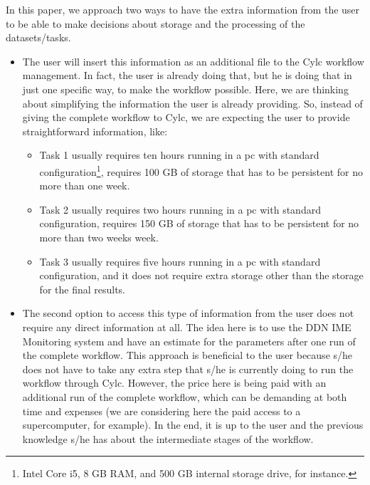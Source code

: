 \documentclass[a4paper]{article}
\begin{document}
In this paper, we approach two ways to have the extra information from the user to be able to make decisions about storage and the processing of the datasets/tasks.

\begin{itemize}

\item The user will insert this information as an additional file to the Cylc workflow management. In fact, the user is already doing that, but he is doing that in just one specific way, to make the workflow possible. Here, we are thinking about simplifying the information the user is already providing. So, instead of giving the complete workflow to Cylc, we are expecting the user to provide straightforward information, like:

\begin{itemize}

\item Task 1 usually requires ten hours running in a pc with standard configuration\footnote{Intel Core i5, 8 GB RAM, and 500 GB internal storage drive, for instance.}, requires 100 GB of storage that has to be persistent for no more than one week.

\item Task 2 usually requires two hours running in a pc with standard configuration, requires 150 GB of storage that has to be persistent for no more than two weeks week.

\item Task 3 usually requires five hours running in a pc with standard configuration, and it does not require extra storage other than the storage for the final results.

\end{itemize}

\item The second option to access this type of information from the user does not require any direct information at all. The idea here is to use the DDN IME Monitoring system and have an estimate for the parameters after one run of the complete workflow. This approach is beneficial to the user because s/he does not have to take any extra step that s/he is currently doing to run the workflow through Cylc. However, the price here is being paid with an additional run of the complete workflow, which can be demanding at both time and expenses (we are considering here the paid access to a supercomputer, for example). In the end, it is up to the user and the previous knowledge s/he has about the intermediate stages of the workflow.

\end{itemize}
\end{document}

